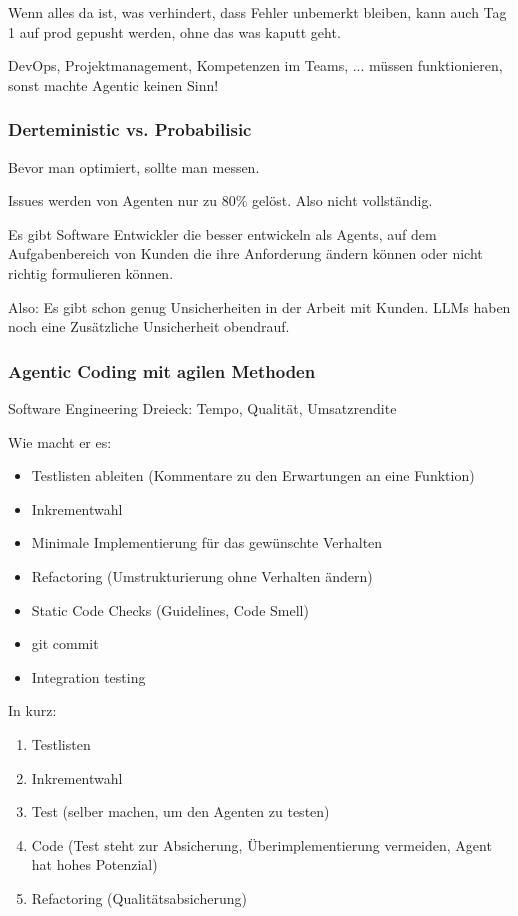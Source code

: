 \documentclass[a4paper]{article}
\begin{document}
Wenn alles da ist, was verhindert, dass Fehler unbemerkt bleiben, kann auch Tag 1 auf prod gepusht werden, ohne das was kaputt geht.

DevOps, Projektmanagement, Kompetenzen im Teams, ... müssen funktionieren, sonst machte Agentic keinen Sinn!

\subsubsection{Derteministic vs. Probabilisic}

Bevor man optimiert, sollte man messen.

Issues werden von Agenten nur zu 80\% gelöst. Also nicht vollständig.

Es gibt Software Entwickler die besser entwickeln als Agents, auf dem Aufgabenbereich von Kunden die ihre Anforderung ändern können oder nicht richtig formulieren können.

Also: Es gibt schon genug Unsicherheiten in der Arbeit mit Kunden. LLMs haben noch eine Zusätzliche Unsicherheit obendrauf.

\subsubsection{Agentic Coding mit agilen Methoden}

Software Engineering Dreieck: Tempo, Qualität, Umsatzrendite

Wie macht er es:

\begin{itemize}
    \item Testlisten ableiten (Kommentare zu den Erwartungen an eine Funktion)
    \item Inkrementwahl
    \item Minimale Implementierung für das gewünschte Verhalten
    \item Refactoring (Umstrukturierung ohne Verhalten ändern)
    \item Static Code Checks (Guidelines, Code Smell)
    \item git commit
    \item Integration testing
\end{itemize}

In kurz:

\begin{enumerate}
    \item Testlisten
    \item Inkrementwahl
    \item Test (selber machen, um den Agenten zu testen)
    \item Code (Test steht zur Absicherung, Überimplementierung vermeiden, Agent hat hohes Potenzial)
    \item Refactoring (Qualitätsabsicherung)
\end{enumerate}
\end{document}
